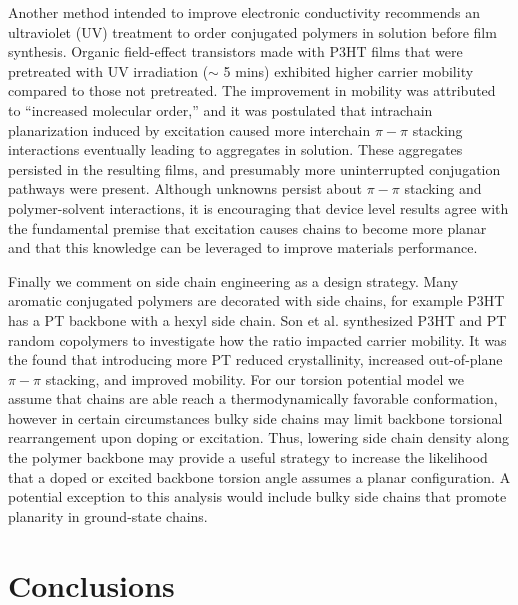 Another method intended to improve electronic conductivity recommends an ultraviolet (UV) treatment to order conjugated polymers in solution before film synthesis.\cite{Chang2014} Organic field-effect transistors made with P3HT films that were pretreated with UV irradiation ($\sim$ 5 mins) exhibited higher carrier mobility compared to those not pretreated. The improvement in mobility was attributed to ``increased molecular order,'' and it was postulated that intrachain planarization induced by excitation caused more interchain $\pi-\pi$ stacking interactions eventually leading to aggregates in solution. These aggregates persisted in the resulting films,\cite{Chang2014} and presumably more uninterrupted conjugation pathways were present. Although unknowns persist about $\pi-\pi$ stacking and polymer-solvent interactions, it is encouraging that device level results agree with the fundamental premise that excitation causes chains to become more planar and that this knowledge can be leveraged to improve materials performance.

Finally we comment on side chain engineering as a design strategy. Many aromatic conjugated polymers are decorated with side chains, for example P3HT has a PT backbone with a hexyl side chain. Son et al. synthesized P3HT and PT random copolymers to investigate how the ratio impacted carrier mobility. It was the found that introducing more PT reduced crystallinity, increased out-of-plane $\pi-\pi$ stacking, and improved mobility.\cite{Son2016} For our torsion potential model we assume that chains are able reach a thermodynamically favorable conformation, however in certain circumstances bulky side chains may limit backbone torsional rearrangement upon doping or excitation. Thus, lowering side chain density along the polymer backbone may provide a useful strategy to increase the likelihood that a doped or excited backbone torsion angle assumes a planar configuration. A potential exception to this analysis would include bulky side chains that promote planarity in ground-state chains.\cite{Raithel2018}

\section{Conclusions}


